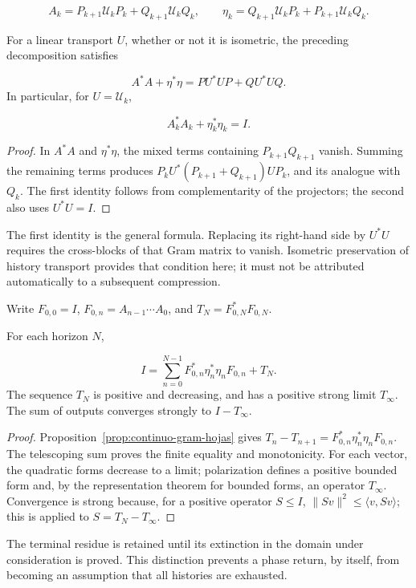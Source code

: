 \[
A_k=P_{k+1}\mathcal U_kP_k+Q_{k+1}\mathcal U_kQ_k,
\qquad
\eta_k=Q_{k+1}\mathcal U_kP_k+P_{k+1}\mathcal U_kQ_k.
\]
\begin{proposition}
\label{prop:continuo-gram-hojas}
For a linear transport \(U\), whether or not it is isometric, the preceding decomposition satisfies

\[
A^*A+\eta^*\eta=PU^*UP+QU^*UQ.
\]
In particular, for \(U=\mathcal U_k\),

\[
A_k^*A_k+\eta_k^*\eta_k=I.
\]
\end{proposition}
\begin{proof}
In \(A^*A\) and \(\eta^*\eta\), the mixed terms containing \(P_{k+1}Q_{k+1}\) vanish. Summing the remaining terms produces \(P_kU^*(P_{k+1}+Q_{k+1})UP_k\), and its analogue with \(Q_k\). The first identity follows from complementarity of the projectors; the second also uses \(U^*U=I\).
\end{proof}

The first identity is the general formula. Replacing its right-hand side by \(U^*U\) requires the cross-blocks of that Gram matrix to vanish. Isometric preservation of history transport provides that condition here; it must not be attributed automatically to a subsequent compression.

Write \(F_{0,0}=I\), \(F_{0,n}=A_{n-1}\cdots A_0\), and \(T_N=F_{0,N}^*F_{0,N}\).

\begin{theorem}
\label{thm:continuo-descomposicion-terminal}
For each horizon \(N\),

\[
I=\sum_{n=0}^{N-1}
F_{0,n}^*\eta_n^*\eta_nF_{0,n}+T_N.
\]
The sequence \(T_N\) is positive and decreasing, and has a positive strong limit \(T_\infty\). The sum of outputs converges strongly to \(I-T_\infty\).
\end{theorem}
\begin{proof}
Proposition~\ref{prop:continuo-gram-hojas} gives \(T_n-T_{n+1}=F_{0,n}^*\eta_n^*\eta_nF_{0,n}\). The telescoping sum proves the finite equality and monotonicity. For each vector, the quadratic forms decrease to a limit; polarization defines a positive bounded form and, by the representation theorem for bounded forms, an operator \(T_\infty\). Convergence is strong because, for a positive operator \(S\leq I\), \(\|Sv\|^2\leq\langle v,Sv\rangle\); this is applied to \(S=T_N-T_\infty\).
\end{proof}

The terminal residue is retained until its extinction in the domain under consideration is proved. This distinction prevents a phase return, by itself, from becoming an assumption that all histories are exhausted.

